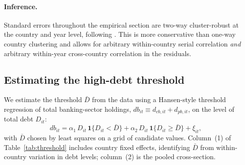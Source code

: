 \documentclass[\latexroot/\projectname]{subfiles}
\begin{document}
\paragraph{Inference.}
Standard errors throughout the empirical section are two-way
cluster-robust at the country and year level, following
\citet{CameronGelbachMiller2011}. This is more conservative than
one-way country clustering and allows for arbitrary within-country
serial correlation \emph{and} arbitrary within-year cross-country
correlation in the residuals.

\subsection{Estimating the high-debt threshold}
\label{sec:hansen-threshold}

We estimate the threshold $\bar D$ from the data using a Hansen-style
threshold regression of total banking-sector holdings,
$\mathit{db}_{it}\equiv d_{cb,it}+d_{pb,it}$, on the level of total
debt $D_{it}$:
\[
  \mathit{db}_{it}
   = \alpha_1\, D_{it}\,\mathbf{1}\{D_{it}<\bar D\}
   + \alpha_2\, D_{it}\,\mathbf{1}\{D_{it}\ge\bar D\}
   + \xi_{it},
\]
with $\bar D$ chosen by least squares on a grid of candidate values.
Column~(1) of Table~\ref{tab:threshold} includes country fixed
effects, identifying $\bar D$ from within-country variation in debt
levels; column~(2) is the pooled cross-section.
\end{document}
